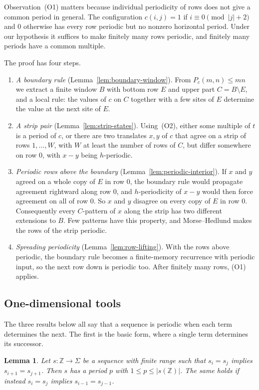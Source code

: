 \documentclass[11pt,a4paper,reqno]{amsart}
\newtheorem{lemma}[theorem]{Lemma}
\theoremstyle{definition}
\theoremstyle{remark}
\newcommand{\Z}{\mathbb Z}
\numberwithin{equation}{section}
\begin{document}
Observation~(O1) matters because individual periodicity of rows does not give a common period in general. The configuration $c(i,j)=1$ if $i\equiv0\pmod{|j|+2}$ and $0$ otherwise has every row periodic but no nonzero horizontal period. Under our hypothesis it suffices to make finitely many rows periodic, and finitely many periods have a common multiple.

The proof has four steps.
\begin{enumerate}
\item \emph{A boundary rule} (Lemma~\ref{lem:boundary-window}). From $P_c(m,n)\le mn$ we extract a finite window $B$ with bottom row $E$ and upper part $C=B\setminus E$, and a local rule: the values of $c$ on $C$ together with a few sites of $E$ determine the value at the next site of $E$.
\item \emph{A strip pair} (Lemma~\ref{lem:strip-states}). Using~(O2), either some multiple of $t$ is a period of $c$, or there are two translates $x,y$ of $c$ that agree on a strip of rows $1,\ldots,W$, with $W$ at least the number of rows of $C$, but differ somewhere on row $0$, with $x-y$ being $h$-periodic.
\item \emph{Periodic rows above the boundary} (Lemma~\ref{lem:periodic-interior}). If $x$ and $y$ agreed on a whole copy of $E$ in row $0$, the boundary rule would propagate agreement rightward along row $0$, and $h$-periodicity of $x-y$ would then force agreement on all of row $0$. So $x$ and $y$ disagree on every copy of $E$ in row $0$. Consequently every $C$-pattern of $x$ along the strip has two different extensions to $B$. Few patterns have this property, and Morse--Hedlund makes the rows of the strip periodic.
\item \emph{Spreading periodicity} (Lemma~\ref{lem:row-lifting}). With the rows above periodic, the boundary rule becomes a finite-memory recurrence with periodic input, so the next row down is periodic too. After finitely many rows, (O1) applies.
\end{enumerate}

\subsection{One-dimensional tools}
The three results below all say that a sequence is periodic when each term determines the next. The first is the basic form, where a single term determines its successor.

\begin{lemma}\label{lem:finite-states}
Let $s\colon\Z\to\Sigma$ be a sequence with finite range such that $s_i=s_j$ implies $s_{i+1}=s_{j+1}$. Then $s$ has a period $p$ with $1\le p\le|s(\Z)|$. The same holds if instead $s_i=s_j$ implies $s_{i-1}=s_{j-1}$.
\end{lemma}
\end{document}
